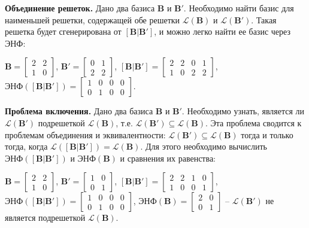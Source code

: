 \textbf{Объединение решеток.} Дано два базиса $ \mathbf{B} $ и $ \mathbf{B}' $. Необходимо найти базис для наименьшей решетки, содержащей обе решетки $ \mathcal{L}(\mathbf{B}) $ и $ \mathcal{L}(\mathbf{B}') $. Такая решетка будет сгенерирована от $ \left[\mathbf{B}|\mathbf{B}'\right] $, и можно легко найти ее базис через ЭНФ:

$ \mathbf{B} = \left[\begin{array}{cccc}
2 & 2 \\
1 & 0
\end{array}\right] $, 
$ \mathbf{B}' = \left[\begin{array}{cccc}
0 & 1 \\
2 & 2
\end{array}\right] $, 
$ \left[\mathbf{B} | \mathbf{B}'\right] = \left[\begin{array}{cccc}
2 & 2 & 0 & 1 \\
1 & 0 & 2 & 2
\end{array}\right] $, 
$ \text{ЭНФ}(\left[\mathbf{B} | \mathbf{B}' \right]) = \left[\begin{array}{cccc}
1 & 0 & 0 & 0 \\
0 & 1 & 0 & 0
\end{array}\right] $.

\textbf{Проблема включения.} Дано два базиса $ \mathbf{B} $ и $ \mathbf{B}' $. Необходимо узнать, является ли $ \mathcal{L}(\mathbf{B}') $ подрешеткой $ \mathcal{L}(\mathbf{B}) $, т.е. $ \mathcal{L}(\mathbf{B}') \subseteq \mathcal{L}(\mathbf{B}) $. Эта проблема сводится к проблемам объединения и эквивалентности: $ \mathcal{L}(\mathbf{B}') \subseteq \mathcal{L}(\mathbf{B}) $ тогда и только тогда, когда $ \mathcal{L}(\left[\mathbf{B}|\mathbf{B}'\right]) = \mathcal{L}(\mathbf{B}) $. Для этого необходимо вычислить $ \text{ЭНФ}(\left[\mathbf{B} | \mathbf{B}' \right]) $ и $ \text{ЭНФ}(\mathbf{B}) $ и сравнения их равенства:

$ \mathbf{B} = \left[\begin{array}{cccc}
2 & 2 \\
1 & 0
\end{array}\right] $, 
$ \mathbf{B}' = \left[\begin{array}{cccc}
1 & 0 \\
0 & 1
\end{array}\right] $, 
$ \left[\mathbf{B} | \mathbf{B}'\right] = \left[\begin{array}{cccc}
2 & 2 & 1 & 0 \\
1 & 0 & 0 & 1
\end{array}\right] $, 
$ \text{ЭНФ}(\left[\mathbf{B} | \mathbf{B}' \right]) = \left[\begin{array}{cccc}
1 & 0 & 0 & 0 \\
0 & 1 & 0 & 0
\end{array}\right] $,
$ \text{ЭНФ}(\mathbf{B}) = \left[\begin{array}{cccc}
2 & 0 \\
0 & 1
\end{array}\right] $ -- $ \mathcal{L}(\mathbf{B}') $ не является подрешеткой $ \mathcal{L}(\mathbf{B}) $.

